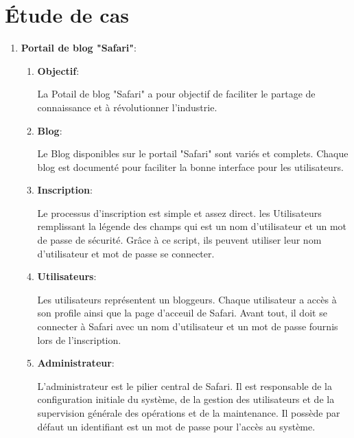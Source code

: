 
\section{Étude de cas}



\begin{enumerate}
    \item \textbf{Portail de blog "Safari"}:\\
    \begin{enumerate}
        \item \textbf{Objectif}:
        
        La Potail de blog "Safari" a pour objectif de faciliter le partage de connaissance et à révolutionner l’industrie.\\
        
        \item \textbf{Blog}:
        
        Le Blog disponibles sur le portail "Safari" sont variés et complets. Chaque blog est documenté pour faciliter la bonne interface pour les utilisateurs.\\
        
        \item \textbf{Inscription}:
        
        Le processus d’inscription  est simple et assez direct. les Utilisateurs remplissant la légende des champs qui est un nom d’utilisateur et un mot de passe de sécurité.
Grâce à ce script, ils peuvent utiliser leur nom d’utilisateur et mot de passe se connecter.\\
        
        \item \textbf{Utilisateurs}:
        
        Les utilisateurs représentent un bloggeurs. Chaque utilisateur a accès à son profile ainsi que la page d'acceuil de Safari. Avant tout, il doit se connecter à Safari avec un nom d'utilisateur et un mot de passe fournis lors de l'inscription.\\
        
        \item \textbf{Administrateur}:
        
        L'administrateur est le pilier central de Safari. Il est responsable de la configuration initiale du système, de la gestion des utilisateurs et de la supervision générale des opérations et de la maintenance. Il possède par défaut un identifiant est un mot de passe pour l’accès au système.
    \end{enumerate}
\end{enumerate}